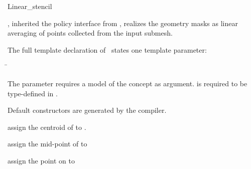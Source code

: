 \begin{ccRefClass}{Linear_stencil}

\ccDefinition

\ccClassTemplateName , inherited the policy interface from
, realizes the geometry masks as linear 
averaging of points collected from the input submesh.


\ccParameters

The full template declaration of \ccClassTemplateName\ states one
template parameter:

\begin{tabbing}
 \= 
\end{tabbing}
   
The  parameter requires a model of 
the  concept as argument. 
 is required to be type-defined in .

\ccCreation

Default constructors are generated by the compiler.


\ccThree{}{}{}

{assign the centroid of  to .}

{assign the mid-point of  to }

{assign the point on  to }

\ccSeeAlso

\\
\\
\\
\\
\\

\end{ccRefClass}

\ccRefPageEnd



